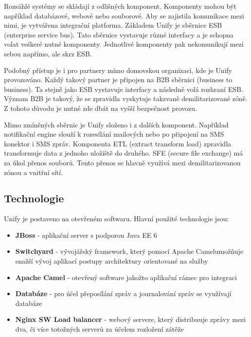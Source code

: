 \documentclass[thesis=M,czech]{FITthesis}[2012/10/20]
\begin{document}
			Rozsáhlé systémy se skládají z odlišných komponent. Komponenty mohou být například databázové, webové nebo souborové. Aby se zajistila komunikace mezi nimi, je vytvářena integrační platforma. Základem Unify je sběrnice ESB (enterprise service bus). Tato sběrnice vystavuje různé interfacy a je schopna volat veškeré nutné komponenty. Jednotlivé komponenty pak nekomunikují mezi sebou napřímo, ale skrz ESB. 
			
			Podobný přístup je i pro partnery mimo domovskou organizaci, kde je Unify provozováno. Každý takový partner je připojen na B2B sběrnici (business to business). Ta stejně jako ESB vystavuje interfacy a následně volá rozhraní ESB. Význam B2B je takový, že se zpravidla vyskytuje takzvaně demilitarizované zóně. Z tohoto důvodu je nutné zde dbát na vyšší bezpečnost provozu.
			
			Mimo zmíněných sběrnic je Unify složeno i z dalších komponent. Například notifikační engine slouží k rozesílání mailových nebo po připojení na SMS konektor i SMS zpráv. Komponenta ETL (extract transform load) zpravidla transformuje data z jednoho uložiště do druhého. SFE (secure file exchange) má za úkol přenos souborů. Tento přenos se hlavně využívá mezi demilitarizovanou zónou a vnitřní sítí.
			
		\subsection{Technologie}
			\label{sec:unify-technologi}
			Unify je postaveno na otevřeném softwaru. Hlavní použité technologie jsou: 
			
			\begin{itemize} 
				\item \textbf{JBoss} - aplikační server s podporou Java EE 6 \cite{oracleJavaEE6}
				\item \textbf{Switchyard} - vývojářský framework, který pomocí Apache Camel\texttrademark  umožňuje snažší vývoj aplikací postupy architektury orientované na služby 
				\item \textbf{Apache Camel \texttrademark } - otevřený software jakožto aplikační rámec pro integraci
				\item \textbf{Databáze} - pro účel přeposílání zpráv a journalování zpráv se využívají databáze
				\item \textbf{Nginx SW Load balancer} - webový servere, který distribuuje zprávy mezi dva, či více totožných serverů za účelem rozložení zátěže   		
			\end{itemize}
			
\end{document}
